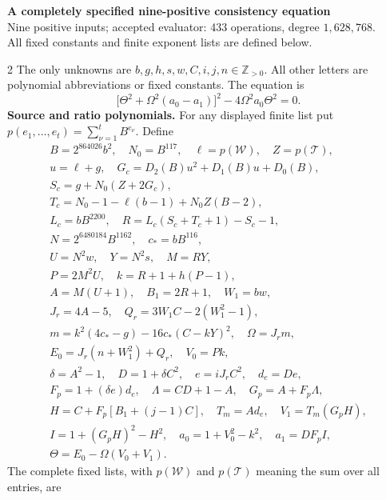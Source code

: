 \documentclass[10pt]{article}
\let\bigsum\sum
\renewcommand{\sum}{\bigsum\nolimits}
\begin{document}
\begin{center}
{\large\bfseries A completely specified nine-positive consistency equation}\\[-1pt]
{\small Nine positive inputs; accepted evaluator: 433 operations, degree $1{,}628{,}768$.}\\[-1pt]
{\small All fixed constants and finite exponent lists are defined below.}
\end{center}
\vspace{-8pt}
\begin{multicols}{2}
\fontsize{9}{9.6}\selectfont
The only unknowns are $b,g,h,s,w,C,i,j,n\in\mathbb Z_{>0}$.
All other letters are polynomial abbreviations or fixed constants.
The equation is
\[
\boxed{\bigl[\Theta^2+\Omega^2(a_0-a_1)\bigr]^2
       -4\Omega^2a_0\Theta^2=0.}
\]
\textbf{Source and ratio polynomials.} For any displayed finite list put
$p(e_1,\ldots,e_t)=\sum_{\nu=1}^{t}B^{e_\nu}$. Define
\[
\begin{gathered}
B=2^{864026}b^2,\quad N_0=B^{117},\quad\ell=p(\mathcal W),\quad Z=p(\mathcal T),\\
u=\ell+g,\quad G_c=D_2(B)u^2+D_1(B)u+D_0(B),\\
S_c=g+N_0(Z+2G_c),\\
T_c=N_0-1-\ell(b-1)+N_0Z(B-2),\\
L_c=bB^{2200},\quad R=L_c(S_c+T_c+1)-S_c-1,\\
N=2^{6480184}B^{1162},\quad c_*=bB^{116},\\
U=N^2w,\quad Y=N^2s,\quad M=RY,\\
P=2M^2U,\quad k=R+1+h(P-1),\\
A=M(U+1),\quad B_1=2R+1,\quad W_1=bw,\\
J_r=4A-5,\quad Q_r=3W_1C-2(W_1^2-1),\\
m=k^2(4c_*-g)-16c_*(C-kY)^2,\quad\Omega=J_rm,\\
E_0=J_r(n+W_1^2)+Q_r,\quad V_0=Pk,\\
\delta=A^2-1,\quad D=1+\delta C^2,\quad e=iJ_rC^2,\quad d_e=De,\\
F_p=1+(\delta e)d_e,\quad\Lambda=CD+1-A,\quad G_p=A+F_p\Lambda,\\
H=C+F_p[B_1+(j-1)C],\quad T_m=Ad_e,\quad V_1=T_m(G_pH),\\
I=1+(G_pH)^2-H^2,\quad a_0=1+V_0^2-k^2,\quad a_1=DF_pI,\\
\Theta=E_0-\Omega(V_0+V_1).
\end{gathered}
\]
The complete fixed lists, with $p(\mathcal W)$ and $p(\mathcal T)$ meaning
the sum over all entries, are
\[
\begin{aligned}

\end{aligned}\]
\end{multicols}
\end{document}
